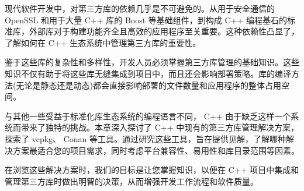 现代软件开发中，对第三方库的依赖几乎是不可避免的。从用于安全通信的 OpenSSL 和用于大量 C++ 库的 Boost 等基础组件，到构成 C++ 编程基石的标准库，外部库对于构建功能齐全且高效的应用程序至关重要。这种依赖性凸显了，了解如何在 C++ 生态系统中管理第三方库的重要性。

鉴于这些库的复杂性和多样性，开发人员必须掌握第三方库管理的基础知识。这些知识不仅有助于将这些库无缝集成到项目中，而且还会影响部署策略。库的编译方法(无论是静态还是动态)都会直接影响部署的文件数量和应用程序的整体占用空间。

与其他一些受益于标准化库生态系统的编程语言不同， C++ 由于缺乏这样一个系统而带来了独特的挑战。本章深入探讨了 C++ 中现有的第三方库管理解决方案，探索了 vcpkg、 Conan 等工具。通过研究这些工具，旨在提供见解，了解哪种解决方案最适合您的项目需求，同时考虑平台兼容性、易用性和库目录范围等因素。

在浏览这些解决方案时，我们的目标是让您掌握知识，以便在 C++ 项目中集成和管理第三方库时做出明智的决策，从而增强开发工作流程和软件质量。
